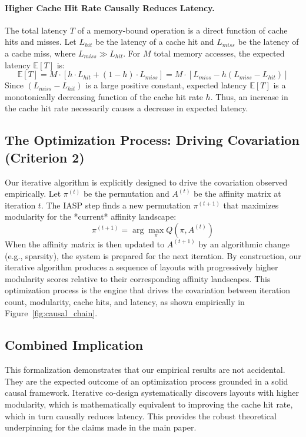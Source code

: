 \documentclass{article}
\begin{document}
\paragraph{Higher Cache Hit Rate Causally Reduces Latency.} The total latency $T$ of a memory-bound operation is a direct function of cache hits and misses. Let $L_{hit}$ be the latency of a cache hit and $L_{miss}$ be the latency of a cache miss, where $L_{miss} \gg L_{hit}$. For $M$ total memory accesses, the expected latency $\mathbb{E}[T]$ is:
\[
\mathbb{E}[T] = M \cdot [h \cdot L_{hit} + (1-h) \cdot L_{miss}] = M \cdot [L_{miss} - h(L_{miss} - L_{hit})]
\]
Since $(L_{miss} - L_{hit})$ is a large positive constant, expected latency $\mathbb{E}[T]$ is a monotonically decreasing function of the cache hit rate $h$. Thus, an increase in the cache hit rate necessarily causes a decrease in expected latency.

\subsection{The Optimization Process: Driving Covariation (Criterion 2)}
Our iterative algorithm is explicitly designed to drive the covariation observed empirically. Let \( \pi^{(t)} \) be the permutation and \( A^{(t)} \) be the affinity matrix at iteration $t$. The IASP step finds a new permutation $\pi^{(t+1)}$ that maximizes modularity for the *current* affinity landscape:
\[
\pi^{(t+1)} = \arg\max_{\pi} Q(\pi, A^{(t)})
\]
When the affinity matrix is then updated to $A^{(t+1)}$ by an algorithmic change (e.g., sparsity), the system is prepared for the next iteration. By construction, our iterative algorithm produces a sequence of layouts with progressively higher modularity scores relative to their corresponding affinity landscapes. This optimization process is the engine that drives the covariation between iteration count, modularity, cache hits, and latency, as shown empirically in Figure~\ref{fig:causal_chain}.

\subsection{Combined Implication}
This formalization demonstrates that our empirical results are not accidental. They are the expected outcome of an optimization process grounded in a solid causal framework. Iterative co-design systematically discovers layouts with higher modularity, which is mathematically equivalent to improving the cache hit rate, which in turn causally reduces latency. This provides the robust theoretical underpinning for the claims made in the main paper.
\end{document}
